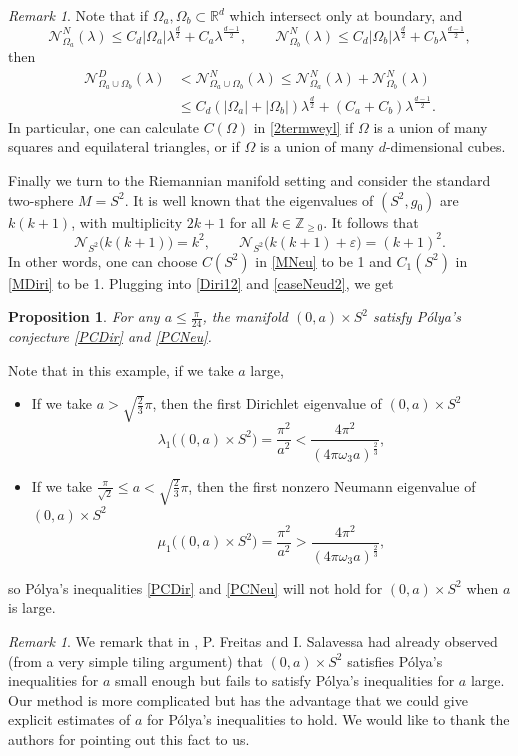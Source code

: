 \documentclass[11pt,letterpaper]{amsart}
\numberwithin{equation}{section}
\theoremstyle{plain}
\newtheorem{proposition}[theorem]{Proposition}
\theoremstyle{plain}
\numberwithin{equation}{section}
\theoremstyle{remark}
\newtheorem{remark}[theorem]{Remark}
\begin{document}
\begin{remark}\label{computaCOmega}
	Note that if $\Omega_a, \Omega_b\subset \mathbb R^d$ which intersect only at boundary,  and
	\[
	\mathcal N^N_{\Omega_a}(\lambda)\le C_d|\Omega_a|\lambda^{\frac{d}{2}}+ C_a\lambda^{\frac{d-1}{2}},\qquad \mathcal N^N_{\Omega_b}(\lambda)\le C_d|\Omega_b|\lambda^{\frac{d}{2}}+ C_b\lambda^{\frac{d-1}{2}},
	\]
	then
	\[
	\begin{aligned} 
	\mathcal N^D_{\Omega_a\cup\Omega_b}(\lambda)&< \mathcal N^N_{\Omega_a\cup\Omega_b}(\lambda)\le \mathcal N^N_{\Omega_a}(\lambda)+ \mathcal N^N_{\Omega_b}(\lambda)\\
	&\le C_d(|\Omega_a|+|\Omega_b|)\lambda^{\frac{d}{2}}+(C_a+C_b)\lambda^{\frac{d-1}{2}}.
	\end{aligned}
	\]
    In particular, one can calculate $C(\Omega)$ in \eqref{2termweyl} if $\Omega$ is a union of many squares and equilateral triangles, or if $\Omega$ is a union of many $d$-dimensional cubes.  
\end{remark}

Finally we turn to the Riemannian manifold setting and consider the standard two-sphere $M=S^2$. 
It is well known that the eigenvalues of $(S^2, g_0)$ are $k(k+1)$, with multiplicity $2k+1$ for all $k\in \mathbb Z_{\ge 0}$. It follows that 
\[
\mathcal N_{S^2}\big( k(k+1) \big)=k^2, \qquad \mathcal N_{S^2}\big(k(k+1)+\varepsilon\big)=(k+1)^2.
\] 
In other words, one can choose $C(S^2)$ in \eqref{MNeu} to be 1 and $C_1(S^2)$ in \eqref{MDiri} to be  1. Plugging into \eqref{Diri12} and \eqref{caseNeud2},  we get
\begin{proposition} \label{S2example}
	For any $a \le \frac {\pi}{24}$, the manifold $(0,a)\times S^2$ satisfy P\'olya's conjecture \eqref{PCDir} and \eqref{PCNeu}. 
\end{proposition}

Note that in this example, if we take $a$ large,  
\begin{itemize}
	\item If we take $a>\sqrt{\frac 23}\pi$, then the first Dirichlet eigenvalue of $(0,a) \times S^2$  
	\[\lambda_1 \big((0,a)\times S^2\big)=\frac{\pi^2}{a^2} <\frac{4\pi^2}{({4\pi\omega_3}a)^{\frac 23} },\]
	\item If we take $\frac{\pi}{\sqrt 2}\le a< \sqrt{\frac 23}\pi$, then the first nonzero Neumann eigenvalue of $(0,a) \times S^2$  
	\[\mu_1 \big((0,a)\times S^2\big)=\frac{\pi^2}{a^2} > \frac{4\pi^2}{({4\pi\omega_3}a)^{\frac 23} },\]
\end{itemize}
so P\'olya's inequalities \eqref{PCDir} and \eqref{PCNeu} will not hold for $(0,a)\times S^2$ when $a$ is large.  
\begin{remark}
	We remark that in \cite[Example 2.D]{Fre02}, P. Freitas and I. Salavessa had already observed (from a very simple tiling argument) that $(0,a)\times S^2$ satisfies P\'olya's inequalities for $a$ small enough but  fails to satisfy 	P\'olya's inequalities for $a$ large. Our method is more complicated but has the advantage that we could give explicit estimates of $a$ for   P\'olya's inequalities to hold. We would like to thank the authors for pointing out this fact to us. 
\end{remark}	
\end{document}
